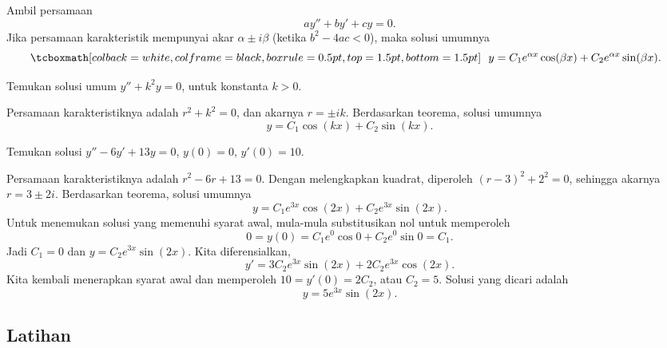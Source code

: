 \begin{theorem}
Ambil persamaan
\begin{equation*}
ay'' + by' + cy = 0 .
\end{equation*}
Jika persamaan karakteristik mempunyai akar $\alpha \pm i \beta$ (ketika $b^2 - 4ac < 0$), maka solusi umumnya
\begin{equation*}
\mybxbg{~~
y = C_1 e^{\alpha x} \cos (\beta x) + C_2 e^{\alpha x} \sin (\beta x) .
~~}
\end{equation*}
\end{theorem}

\begin{example} \label{example:sincossecondorder}
Temukan solusi umum $y'' + k^2 y = 0$, untuk konstanta $k > 0$.

Persamaan karakteristiknya adalah $r^2 + k^2 = 0$, dan akarnya $r = \pm ik$. Berdasarkan teorema, solusi umumnya
\begin{equation*}
y = C_1 \cos (kx) + C_2 \sin (kx) .
\end{equation*}
\end{example}

\begin{example}
Temukan solusi $y'' - 6 y' + 13 y = 0$, $y(0) = 0$, $y'(0) = 10$.

Persamaan karakteristiknya adalah $r^2 - 6 r + 13 = 0$. Dengan melengkapkan kuadrat, diperoleh ${(r-3)}^2 + 2^2 = 0$, sehingga akarnya $r = 3 \pm 2i$. Berdasarkan teorema, solusi umumnya
\begin{equation*}
y = C_1 e^{3x} \cos (2x) + C_2 e^{3x} \sin (2x) .
\end{equation*}
Untuk menemukan solusi yang memenuhi syarat awal, mula-mula substitusikan nol untuk memperoleh
\begin{equation*}
0 = y(0) = C_1 e^{0} \cos 0 + C_2 e^{0} \sin 0  = C_1 .
\end{equation*}
Jadi $C_1 = 0$ dan $y = C_2 e^{3x} \sin (2x)$. Kita diferensialkan,
\begin{equation*}
y' = 3C_2 e^{3x} \sin (2x) + 2C_2 e^{3x} \cos (2x) .
\end{equation*}
Kita kembali menerapkan syarat awal dan memperoleh $10 = y'(0) = 2C_2$, atau $C_2 = 5$. Solusi yang dicari adalah
\begin{equation*}
y = 5 e^{3x} \sin (2x) .
\end{equation*}
\end{example}

\subsection{Latihan}

